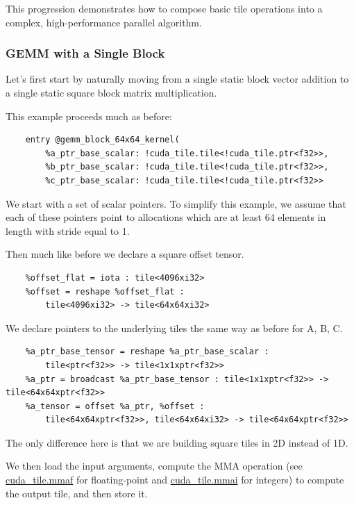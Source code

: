 \documentclass{article}
\begin{document}
This progression demonstrates how to compose basic tile operations into a complex, high-performance parallel algorithm.



\subsubsection{GEMM with a Single Block}

Let's first start by naturally moving from a single static block vector addition to a single static square block matrix multiplication.


This example proceeds much as before:


\begin{lstlisting}
    entry @gemm_block_64x64_kernel(
        %a_ptr_base_scalar: !cuda_tile.tile<!cuda_tile.ptr<f32>>,
        %b_ptr_base_scalar: !cuda_tile.tile<!cuda_tile.ptr<f32>>,
        %c_ptr_base_scalar: !cuda_tile.tile<!cuda_tile.ptr<f32>>
\end{lstlisting}

We start with a set of scalar pointers. To simplify this example, we assume that each of these pointers point to allocations which are at least 64 elements in length with stride equal to 1.


Then much like before we declare a square offset tensor.


\begin{lstlisting}
    %offset_flat = iota : tile<4096xi32>
    %offset = reshape %offset_flat :
        tile<4096xi32> -> tile<64x64xi32>
\end{lstlisting}

We declare pointers to the underlying tiles the same way as before for A, B, C.


\begin{lstlisting}
    %a_ptr_base_tensor = reshape %a_ptr_base_scalar :
        tile<ptr<f32>> -> tile<1x1xptr<f32>>
    %a_ptr = broadcast %a_ptr_base_tensor : tile<1x1xptr<f32>> -> tile<64x64xptr<f32>>
    %a_tensor = offset %a_ptr, %offset :
        tile<64x64xptr<f32>>, tile<64x64xi32> -> tile<64x64xptr<f32>>
\end{lstlisting}

The only difference here is that we are building square tiles in 2D instead of 1D.


We then load the input arguments, compute the MMA operation (see \href{https://docs.nvidia.com/cuda/tile-ir/latest/sections/operations.html#op-cuda-tile-mmaf}{cuda\_tile.mmaf} for floating-point and \href{https://docs.nvidia.com/cuda/tile-ir/latest/sections/operations.html#op-cuda-tile-mmai}{cuda\_tile.mmai} for integers) to compute the output tile, and then store it.
\end{document}
